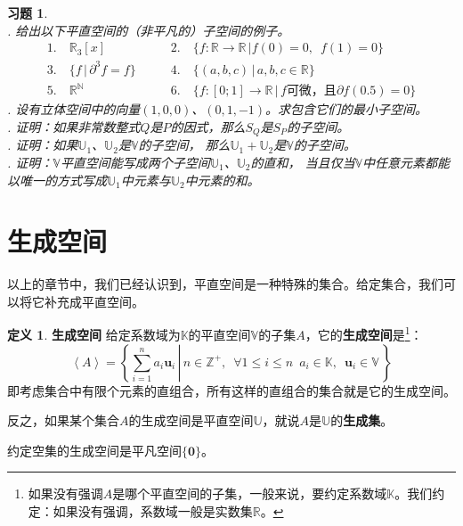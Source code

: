 \documentclass[12pt,UTF8]{ctexbook}
\newcommand{\vect}[1]{\left\langle #1 \right\rangle}
\theoremstyle{definition}
\newtheorem{df}{定义}[section]
\theoremstyle{plain}
\newtheorem{xt}{习题}[section]
\begin{document}
\begin{xt}
    \mbox{} \\
    . 给出以下平直空间的（非平凡的）子空间的例子。\\
    $$
    \begin{array}{ll}
        1. \quad \mathbb{R}_3[x] & \qquad 2. \quad \{f: \mathbb{R} \rightarrow \mathbb{R} \, | f(0) = 0, \,\,\, f(1) = 0\} \\
        3. \quad \{f \, | \, \partial^3 f = f\} & \qquad 4. \quad \{(a, b, c) \, | \, a, b, c \in \mathbb{R}\} \\
        5. \quad \mathbb{R}^\mathbb{N} & \qquad 6. \quad \{f: [0;1] \rightarrow \mathbb{R} \, | \, f \mbox{可微，且} \partial f(0.5) = 0\}
    \end{array}
    $$
    . 设有立体空间中的向量$(1, 0, 0)$、$(0, 1, -1)$。求包含它们的最小子空间。\\
    . 证明：如果非常数整式$Q$是$P$的因式，那么$S_Q$是$S_P$的子空间。\\
    . 证明：如果$\mathbb{U}_1$、$\mathbb{U}_2$是$\mathbb{V}$的子空间，
    那么$\mathbb{U}_1 + \mathbb{U}_2$是$\mathbb{V}$的子空间。\\
    . 证明：$\mathbb{V}$平直空间能写成两个子空间$\mathbb{U}_1$、$\mathbb{U}_2$的直和，
    当且仅当$\mathbb{V}$中任意元素都能以唯一的方式写成$\mathbb{U}_1$中元素与$\mathbb{U}_2$中元素的和。
\end{xt}

\section{生成空间}
以上的章节中，我们已经认识到，平直空间是一种特殊的集合。给定集合，我们可以将它补充成平直空间。
\begin{df}{\textbf{生成空间}}
    给定系数域为$\mathbb{K}$的平直空间$\mathbb{V}$的子集$A$，它的\textbf{生成空间}是\footnote{如果没有强调$A$是哪个平直空间的子集，一般来说，要约定系数域$\mathbb{K}$。我们约定：如果没有强调，系数域一般是实数集$\mathbb{R}$。}：
    $$ \vect{A} = \left\{\left. \sum_{i=1}^n a_i \mathbf{u}_i \, \right| \, n\in\mathbb{Z}^+, \,\,\, \forall 1\leqslant i \leqslant n \,\,\, a_i \in \mathbb{K}, \,\,\, \mathbf{u}_i \in \mathbb{V} \, \right\} $$
    即考虑集合中有限个元素的直组合，所有这样的直组合的集合就是它的生成空间。
    
    反之，如果某个集合$A$的生成空间是平直空间$\mathbb{U}$，就说$A$是$\mathbb{U}$的\textbf{生成集}。

    约定空集的生成空间是平凡空间$\{\mathbf{0}\}$。
\end{df}
\end{document}
